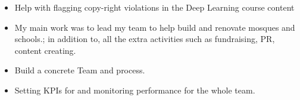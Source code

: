 \documentclass[10pt,a4paper,ragged2e]{altacv}
\begin{document}


\begin{itemize}
\item Help with flagging copy-right violations in the Deep Learning course content
\end{itemize}

\begin{itemize}
\item My main work was to lead my team to help build and renovate mosques and
schools.; in addition to, all the extra activities such as fundraising, PR, content creating.
\smallskip
\item Build a concrete Team and process.
\smallskip

\item Setting KPIs for and monitoring performance for the whole team.
\end{itemize}
\end{document}
